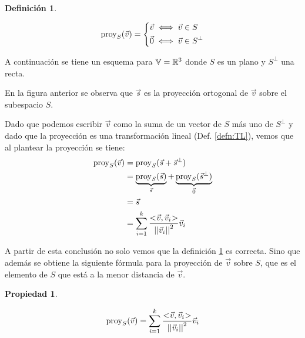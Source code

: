 \documentclass[a5paper,12pt,twoside]{book}
\newtheorem{defn}{{Definición}}[chapter]
\newtheorem{prop}{{Propiedad}}[chapter]
\begin{document}
\begin{mdframed}[style=MyFrame1]
    \begin{defn}
        \label{defn:proyOrto}
    \end{defn}
    \begin{equation*}
        \operatorname{proy}_S(\Vec{v}) =
        \left\{
        \begin{aligned}
            \Vec{v} & \iff \Vec{v} \in S
            \\
            \Vec{0} & \iff \Vec{v} \in S^\perp
        \end{aligned}
        \right.
    \end{equation*}
\end{mdframed}

A continuación se tiene un esquema para $\mathbb{V}=\mathbb{R}^3$ donde $S$ es un plano y $S^\perp$ una recta.

\begin{center}
    \def\svgwidth{0.6\linewidth}
    
\end{center}

En la figura anterior se observa que $\Vec{s}$ es la proyección ortogonal de $\Vec{v}$ sobre el subespacio $S$.

Dado que podemos escribir $\Vec{v}$ como la suma de un vector de $S$ más uno de $S^\perp$ y dado que la proyección es una transformación lineal (Def. \ref{defn:TL}), vemos que al plantear la proyección se tiene:
\begin{align*}
    \operatorname{proy}_S(\Vec{v}) &= \operatorname{proy}_S(\Vec{s}+\Vec{s}^\perp)
    \\
    &= \underbrace{\operatorname{proy}_S(\Vec{s})}_{\Vec{s}} + \underbrace{\operatorname{proy}_S(\Vec{s}^\perp)}_{\Vec{0}}
    \\
    &= \Vec{s}
    \\
    &= \sum_{i=1}^k \frac{<\hspace{-0.8mm}\Vec{v},\Vec{v}_i\hspace{-0.8mm}>}{{\left|\left| {\Vec{v}_i} \right|\right|}^2} \Vec{v}_i
\end{align*}

A partir de esta conclusión no solo vemos que la definición \ref{defn:proyOrto} es correcta. Sino que además se obtiene la siguiente fórmula para la proyección de $\Vec{v}$ sobre $S$, que es el elemento de $S$ que está a la menor distancia de $\Vec{v}$.

\begin{mdframed}[style=MyFrame1]
    \begin{prop}
        \label{prop:proyOrto2}
    \end{prop}
    \begin{equation*}
        \operatorname{proy}_S(\Vec{v}) = \sum_{i=1}^k \frac{<\hspace{-0.8mm}\Vec{v},\Vec{v}_i\hspace{-0.8mm}>}{{\left|\left| {\Vec{v}_i} \right|\right|}^2} \Vec{v}_i
    \end{equation*}
\end{mdframed}
\end{document}
